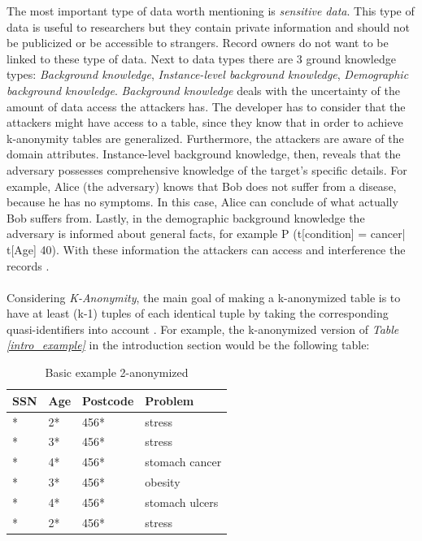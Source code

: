 \documentclass{llncs}
\begin{document}
The most important type of data worth mentioning is \textit{sensitive data}. This type of data is useful to researchers but they contain private information and should not be publicized or be accessible to strangers. Record owners do not want to be linked to these type of data. Next to data types there are 3 ground knowledge types: \textit{Background knowledge}, \textit{Instance-level background knowledge}, \textit{Demographic background knowledge}. \textit{Background knowledge} deals with the uncertainty of the amount of data access the attackers has. The developer has to consider that the attackers might have access to a table, since they know that in order to achieve k-anonymity tables are generalized. Furthermore, the attackers are aware of the domain attributes. Instance-level background knowledge, then, reveals that the adversary possesses comprehensive knowledge of the target’s specific details. For example, Alice (the adversary) knows that Bob does not suffer from a disease, because he has no symptoms. In this case, Alice can conclude of what actually Bob suffers from. Lastly, in the demographic background knowledge the adversary is informed about general facts, for example P (t[condition] = cancer| t[Age] 40). With these information the attackers can access and interference the records \cite{ldiversity}.\\\\
Considering \textit{K-Anonymity}, the main goal of making a k-anonymized table is to have at least (k-1) tuples of each identical tuple by taking the corresponding quasi-identifiers into account  \cite{sweeney2002k,li2006achieving}. For example, the k-anonymized version of \textit{Table  \ref{intro_example}} in the introduction section would be the following table:
\begin{table}[]
	\centering
	\caption{Basic example 2-anonymized}
	\label{intro_example_sol}
	\begin{tabular}{@{}llll@{}}
		\toprule
		SSN         & Age & Postcode & Problem         \\ \midrule
		* & 2*  & 456*     & stress \\
		* & 3*  & 456*     & stress          \\
		* & 4*  & 456*     & stomach cancer  \\
		* & 3*  & 456*     & obesity         \\
		* & 4*  & 456*     & stomach ulcers  \\
		* & 2*  & 456*     & stress          \\ \bottomrule
	\end{tabular}
\end{table}\\
\end{document}
